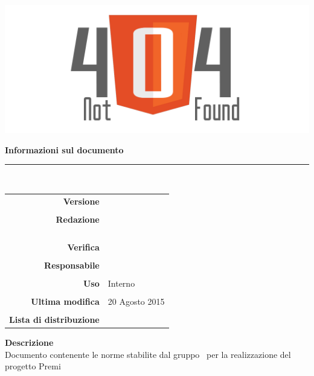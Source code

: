 \thispagestyle{empty}

\begin{titlepage}
	\begin{center}
	\begin{Huge}
		\textbf{\gruppo} \\
	\end{Huge}
	\vspace{0.5cm}
	\begin{Large}
		\textbf{\capitolato}
	\end{Large}
	
	\vspace{1cm}
    
	\includegraphics[scale=0.35]{../logo/logo404_Extends.png}
	\vspace{1cm}
	\begin{Huge}
		\textbf{\titDoc}
	\end{Huge}
	
	\vspace{1cm}
	\textbf{Informazioni sul documento}\\
    \rule{10cm}{.4pt} \\
	\begin{table}[h]
	\begin{center}
	\begin{tabular}{r | l}
		\textbf{Versione} & \versione \\ \\
		\textbf{Redazione} & \CoMa \\
			& \ReAn \\ 
			& \DeEn \\ 
			& \CaMa \\ \\
		\textbf{Verifica} &\VeFe \\ \\
		\textbf{Responsabile} & \CoMa \\ \\
		\textbf{Uso} & Interno \\ \\
		\textbf{Ultima modifica} & 20 Agosto 2015 \\ \\
		\textbf{Lista di distribuzione} & \gruppo \\ 
	\end{tabular}
	\end{center}
	\end{table}
			\textbf{Descrizione} \\
			Documento contenente le norme stabilite dal gruppo \gruppo\ per la realizzazione del progetto Premi
	\end{center}
\end{titlepage}